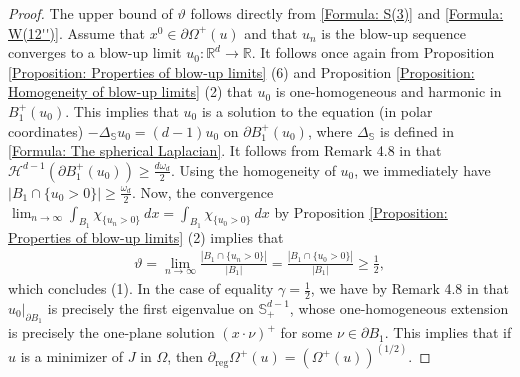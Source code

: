 \documentclass[11pt,reqno]{amsart}
\begin{document}
\begin{proof}
	The upper bound of $\vartheta$ follows directly from \eqref{Formula: S(3)} and \eqref{Formula: W(12'')}. Assume that $x^{0}\in\partial\varOmega^{+}(u)$ and that $u_{n}$ is the blow-up sequence converges to a blow-up limit $u_{0}\colon\mathbb{R}^{d}\to\mathbb{R}$. It follows once again from Proposition \ref{Proposition: Properties of blow-up limits} (6) and Proposition \ref{Proposition: Homogeneity of blow-up limits} (2) that $u_{0}$ is one-homogeneous and harmonic in $B_{1}^{+}(u_{0})$. This implies that $u_{0}$ is a solution to the equation (in polar coordinates) $-\Delta_{\mathbb{S}}u_{0}=(d-1)u_{0}$ on $\partial B_{1}^{+}(u_{0})$, where $\Delta_{\mathbb{S}}$ is defined in \eqref{Formula: The spherical Laplacian}. It follows from Remark 4.8 in \cite{MTV2017} that $\mathcal{H}^{d-1}(\partial B_{1}^{+}(u_{0}))\geqslant\frac{d\omega_{d}}{2}$. Using the homogeneity of $u_{0}$, we immediately have $|B_{1}\cap\{u_{0}>0\}|\geqslant\frac{\omega_{d}}{2}$. Now, the convergence  $\lim_{n\to\infty}\int_{B_{1}}\chi_{\{u_{n}>0\}}\:dx=\int_{B_{1}}\chi_{\{u_{0}>0\}}\:dx$ by Proposition \ref{Proposition: Properties of blow-up limits} (2) implies that
	\begin{align*}
		\vartheta=\lim_{n\to\infty}\frac{|B_{1}\cap\{u_{n}>0\}|}{|B_{1}|}=\frac{|B_{1}\cap\{u_{0}>0\}|}{|B_{1}|}\geqslant\frac{1}{2},
	\end{align*}
    which concludes (1). In the case of equality $\gamma=\frac{1}{2}$, we have by Remark 4.8 in \cite{MTV2022} that $u_{0}|_{\partial B_{1}}$ is precisely the first eigenvalue on $\mathbb{S}^{d-1}_{+}$, whose one-homogeneous extension is precisely the one-plane solution $(x\cdot\nu)^{+}$ for some $\nu\in\partial B_{1}$. This implies that if $u$ is a minimizer of $J$ in $\Omega$, then $\partial_{\mathrm{reg}}\varOmega^{+}(u)=(\varOmega^{+}(u))^{(1/2)}$.
\end{proof}
\end{document}
